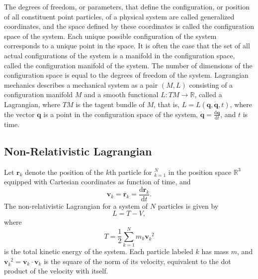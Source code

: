 \documentclass[a4paper,12pt]{article}
\begin{document}
The degrees of freedom, or parameters, that define the configuration, or position of all constituent point particles, of a physical system are called generalized coordinates, and the space defined by these coordinates is called the configuration space of the system. Each unique possible configuration of the system corresponds to a unique point in the space. It is often the case that the set of all actual configurations of the system is a manifold in the configuration space, called the configuration manifold of the system. The number of dimensions of the configuration space is equal to the degrees of freedom of the system.
Lagrangian mechanics describes a mechanical system as a pair $(M,L)$ consisting of a configuration manifold $M$ and a smooth functional $L\colon TM\to\mathbb{R}$, called a Lagrangian, where $TM$ is the tagent bundle of $M$, that is, $L=L(\mathbf{q},\dot{\mathbf{q}},t)$, where the vector $\mathbf{q}$ is a point in the configuration space of the system, $\dot{\mathbf{q}}=\frac{\mathrm{d}\mathbf{q}}{\mathrm{d}t}$, and $t$ is time.
\subsection{Non-Relativistic Lagrangian}
Let $\mathbf{r}_k$ denote the position of the $k$th particle for $_{k=1}^N$ in the position space $\mathbb{R}^3$ equipped with Cartesian coordinates as function of time, and \[\mathbf{v}_k=\dot{\mathbf{r}_k}=\frac{\mathrm{d}\mathbf{r}_k}{\mathrm{d}t}.\]
The non-relativistic Lagrangian for a system of $N$ particles is given by
\[L=T-V,\]
where
\[T=\frac{1}{2}\sum_{k=1}^Nm_k\mathbf{v}_k^{\phantom{k}2}\]
is the total kinetic energy of the system. Each particle labeled $k$ has mass $m$, and $\mathbf{v}_k^{\phantom{k}2}=\mathbf{v}_k\cdot\mathbf{v}_k$ is the square of the norm of its velocity, equivalent to the dot product of the velocity with itself.
\end{document}

